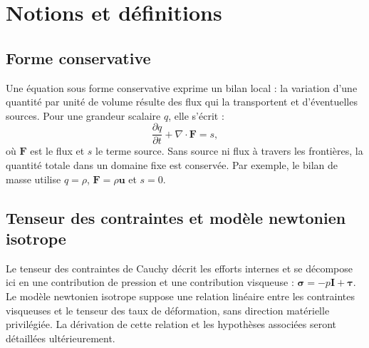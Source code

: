 \section{Notions et définitions}
\label{annexes:notions}

\subsection{Forme conservative}
\label{annexes:forme_conservative}

Une équation sous forme conservative exprime un bilan local :
la variation d'une quantité par unité de volume résulte des flux
qui la transportent et d'éventuelles sources.
Pour une grandeur scalaire $q$, elle s'écrit :
\begin{equation*}
    \frac{\partial q}{\partial t} + \nabla \cdot \mathbf{F} = s,
\end{equation*}
où $\mathbf{F}$ est le flux et $s$ le terme source.
Sans source ni flux à travers les frontières, la quantité totale
dans un domaine fixe est conservée.
Par exemple, le bilan de masse utilise $q = \rho$,
$\mathbf{F} = \rho\mathbf{u}$ et $s = 0$.

\subsection{Tenseur des contraintes et modèle newtonien isotrope}
\label{annexes:type_fluids}

Le tenseur des contraintes de Cauchy décrit les efforts internes
et se décompose ici en une contribution de pression et une contribution
visqueuse : $\boldsymbol{\sigma} = -p\mathbf{I} + \boldsymbol{\tau}$.
Le modèle newtonien isotrope suppose une relation linéaire entre
les contraintes visqueuses et le tenseur des taux de déformation,
sans direction matérielle privilégiée.
La dérivation de cette relation et les hypothèses associées seront
détaillées ultérieurement.
